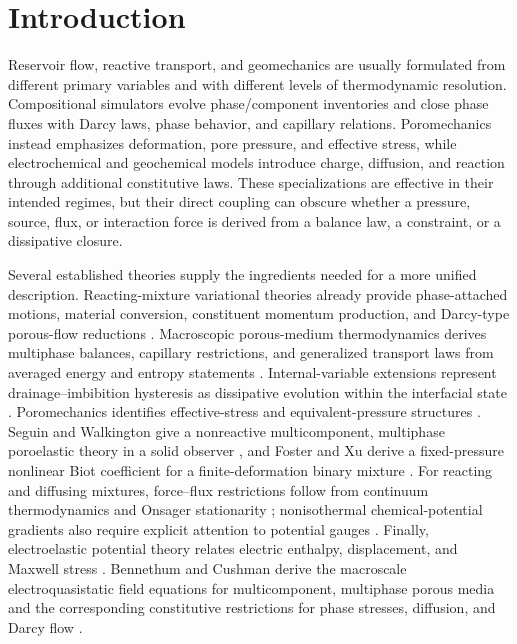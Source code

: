\section{Introduction}
\label{sec:introduction}

Reservoir flow, reactive transport, and geomechanics are usually formulated
from different primary variables and with different levels of thermodynamic
resolution.  Compositional simulators evolve phase/component inventories and
close phase fluxes with Darcy laws, phase behavior, and capillary relations.
Poromechanics instead emphasizes deformation, pore pressure, and effective
stress, while electrochemical and geochemical models introduce charge,
diffusion, and reaction through additional constitutive laws.  These
specializations are effective in their intended regimes, but their direct
coupling can obscure whether a pressure, source, flux, or interaction force is
derived from a balance law, a constraint, or a dissipative closure.

Several established theories supply the ingredients needed for a more unified
description.  Reacting-mixture variational theories already provide
phase-attached motions, material conversion, constituent momentum production,
and Darcy-type porous-flow reductions
\cite{bedford1979variational,drumheller1980thermomechanical,bedford1983theories,drumheller2000}.
Macroscopic porous-medium thermodynamics derives multiphase balances,
capillary restrictions, and generalized transport laws from averaged energy
and entropy statements
\cite{hassanizadeh1993thermodynamic,gray1999thermodynamics}.  Internal-variable
extensions represent drainage--imbibition hysteresis as dissipative evolution
within the interfacial state \cite{wei2006capillary_hysteresis}.  Poromechanics
identifies effective-stress and equivalent-pressure structures
\cite{coussy2004poromechanics,kim2013rigorous}.  Seguin and Walkington give a
nonreactive multicomponent, multiphase poroelastic theory in a solid observer
\cite{seguin2019multicomponent}, and Foster and Xu derive a fixed-pressure
nonlinear Biot coefficient for a finite-deformation binary mixture
\cite{foster2025}.
For reacting and diffusing mixtures, force--flux restrictions follow from
continuum thermodynamics and Onsager stationarity
\cite{bothe2015continuum,doi2011onsager,wang2021onsager}; nonisothermal
chemical-potential gradients also require explicit attention to potential
gauges \cite{goldobin2016thermal}.  Finally, electroelastic potential theory
relates electric enthalpy, displacement, and Maxwell stress
\cite{mcmeeking2007virtual_work_electrostatic,dorfmann2017nonlinear_electroelasticity}.
Bennethum and Cushman derive the macroscale electroquasistatic field equations
for multicomponent, multiphase porous media \cite{bennethum2002electroI} and the corresponding constitutive restrictions for phase stresses, diffusion, and Darcy flow \cite{bennethum2002electroII}.

